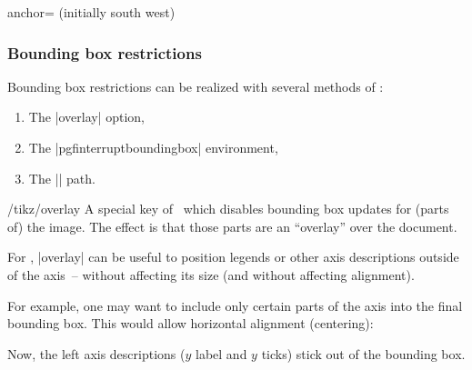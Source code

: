 \begin{pgfplotskey}{anchor= (initially south west)}
\begin{codeexample}[]
\end{codeexample}


\subsubsection{Bounding box restrictions}
Bounding box restrictions can be realized with several methods of \PGF:
\begin{enumerate}
	\item The |overlay| option,
	\item The |pgfinterruptboundingbox| environment,
	\item The |\useasboundingbox| path.
\end{enumerate}
\begin{key}{/tikz/overlay}
	A special key of \PGF\ which disables bounding box updates for (parts of) the image. The effect is that those parts are an ``overlay'' over the document.

	For \PGFPlots, |overlay| can be useful to position legends or other axis descriptions outside of the axis~-- without affecting its size (and without affecting alignment).

For example, one may want to include only certain parts of the axis into the final bounding box. This would allow horizontal alignment (centering):
\begin{codeexample}[]
%
\end{codeexample}
\noindent Now, the left axis descriptions ($y$ label and $y$ ticks) stick out of the bounding box.
	

\end{key}
\end{pgfplotskey}
